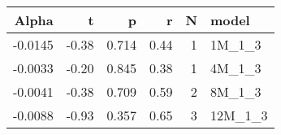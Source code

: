 \begin{table}[ht]
\centering
\begin{tabular}{rrrrrl}
  \hline
Alpha & t & p & r & N & model \\ 
  \hline
-0.0145 & -0.38 & 0.714 & 0.44 & 1 & 1M\_1\_3 \\ 
  -0.0033 & -0.20 & 0.845 & 0.38 & 1 & 4M\_1\_3 \\ 
  -0.0041 & -0.38 & 0.709 & 0.59 & 2 & 8M\_1\_3 \\ 
  -0.0088 & -0.93 & 0.357 & 0.65 & 3 & 12M\_1\_3 \\ 
   \hline
\end{tabular}
\end{table}

